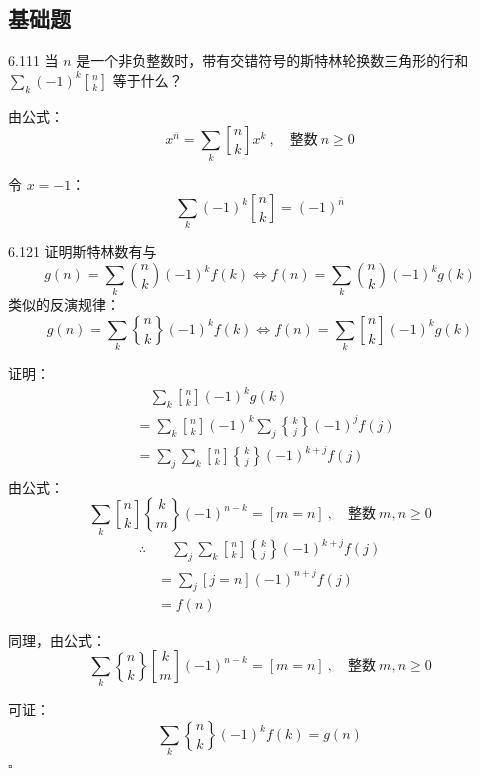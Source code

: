 \subsection{基础题}

\begin{problem}{6.11}{1}
  当 \( n \) 是一个非负整数时，带有交错符号的斯特林轮换数三角形的行和 \( \sum_k (-1)^k \genfrac{[}{]}{0pt}{} {n}{k} \) 等于什么？
\end{problem}

由公式：
\[
  \boxed{x^{\overline{n}} = \sum_k \genfrac{[}{]}{0pt}{} {n}{k} x^k \ , \quad \text{整数} \ n \ge 0}
\]

令 \( x = -1 \)：
\[
  \sum_k (-1)^k \genfrac{[}{]}{0pt}{} {n}{k} = (-1)^{\overline{n}}
\]

\begin{problem}{6.12}{1}
  证明斯特林数有与
  \[
    g(n) = \sum_k \binom{n}{k} (-1)^k f(k) \Leftrightarrow f(n) = \sum_k \binom{n}{k} (-1)^k g(k)
  \]
  类似的反演规律：
  \[
    g(n) = \sum_k \genfrac{\{}{\}}{0pt}{} {n}{k} (-1)^k f(k) \Leftrightarrow f(n) = \sum_k \genfrac{[}{]}{0pt}{} {n}{k} (-1)^k g(k)
  \]
\end{problem}

证明：
\begin{align*}
  & \quad \sum_k \genfrac{[}{]}{0pt}{} {n}{k} (-1)^k g(k) \\
  &= \sum_k \genfrac{[}{]}{0pt}{} {n}{k} (-1)^k \sum_j \genfrac{\{}{\}}{0pt}{} {k}{j} (-1)^j f(j) \\
  &= \sum_j \sum_k \genfrac{[}{]}{0pt}{} {n}{k} \genfrac{\{}{\}}{0pt}{} {k}{j} (-1)^{k+j} f(j) \\
\end{align*}
由公式：
\[
  \boxed{\sum_k \genfrac{[}{]}{0pt}{} {n}{k} \genfrac{\{}{\}}{0pt}{} {k}{m} (-1)^{n-k} = [m=n] \ , \quad \text{整数} \ m,n \ge 0}
\]
\begin{align*}
  \therefore & \quad \sum_j \sum_k \genfrac{[}{]}{0pt}{} {n}{k} \genfrac{\{}{\}}{0pt}{} {k}{j} (-1)^{k+j} f(j) \\
  &= \sum_j [j = n] (-1)^{n+j} f(j) \\
  &= f(n)
\end{align*}

同理，由公式：
\[
  \boxed{\sum_k \genfrac{\{}{\}}{0pt}{} {n}{k} \genfrac{[}{]}{0pt}{} {k}{m} (-1)^{n-k} = [m=n] \ , \quad \text{整数} \ m,n \ge 0}
\]

可证：
\[
  \sum_k \genfrac{\{}{\}}{0pt}{} {n}{k} (-1)^k f(k) = g(n)
\]
\hfill \( \square \)

